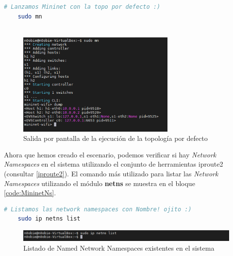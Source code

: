 \begin{lstlisting}[language= bash, style=Consola, caption={Ejecución de Mininet con la topología por defecto},label=code:scenarioMininet]
    # Lanzamos Mininet con la topo por defecto :)
    sudo mn
    
\end{lstlisting}
\vspace{0.5cm}

\begin{figure}[ht]
    \centering
    \includegraphics[width=0.7\textwidth]{archivos/img/teoria/mn_01.png}
    \caption{Salida por pantalla de la ejecución de la topología por defecto}
    \label{fig:mininet_01}
\end{figure}

Ahora que hemos creado el escenario, podemos verificar si hay \textit{Network Namespaces} en el sistema utilizando el conjunto de herramientas iproute2 (consultar \ref{iproute2}). El comando más utilizado para listar las \textit{Network Namespaces} utilizando el módulo \textbf{netns} se muestra en el bloque \ref{code:MininetNs}.


\begin{lstlisting}[language= bash, style=Consola, caption={Listar Named Network Namespaces},label=code:MininetNs]
    # Listamos las network namespaces con Nombre! ojito :)
    sudo ip netns list
\end{lstlisting}
\vspace{0.5cm}

\begin{figure}[ht]
    \centering
    \includegraphics[width=\textwidth]{archivos/img/teoria/mn_02.png}
    \caption{Listado de Named Network Namespaces existentes en el sistema}
    \label{fig:mininet_02}
\end{figure}


